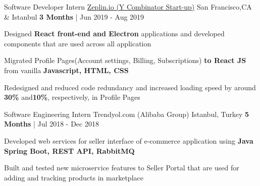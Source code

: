 \begin{cventries}
  \cvexpentry
   {Software Developer Intern} %
    {\href{https://zeplin.io}{Zeplin.io (Y Combinator Start-up)}} %
    {San Francisco,CA \& Istanbul} %
    {\textbf{3 Months} | Jun 2019 - Aug 2019} %
    {
      \begin{cvitems} %
        \item {Designed \textbf{React front-end and Electron} applications and developed components that are used across all application}
		\item {Migrated Profile Pages(Account settings, Billing, Subscriptions) \textbf{to React JS} from vanilla \textbf{Javascript, HTML, CSS}}
        \item {Redesigned and reduced code redundancy and increased loading speed by around \textbf{30\%} and\textbf{10\%}, respectively, in Profile Pages}
      \end{cvitems}
    }
  \cvexpentry
   {Software Engineering Intern} %
    {Trendyol.com (Alibaba Group)} %
    {Istanbul, Turkey} %
    {\textbf{5 Months} | Jul 2018 - Dec 2018} %
    {
      \begin{cvitems} %
		 \item {Developed web services for seller interface of e-commerce application using \textbf{Java Spring Boot, REST API, RabbitMQ}}
        \item {Built and tested new microservice features to Seller Portal that are used for adding and tracking products in marketplace}
      \end{cvitems}
    }
\begin{comment}
  \cventry
    {Research Assistant} %
    {Koc University, Arcelik Research Center for Creative Industries} %
    {Istanbul, Turkey} %
    {\textbf{1+ Years} | Oct 2016 - Feb 2018} %
    {
      \begin{cvitems} %

\end{comment}
\end{cventries}
